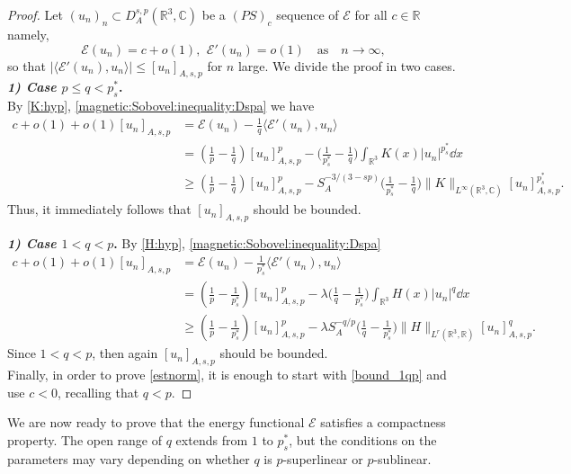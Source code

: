 \documentclass[leqno,11pt]{amsart}
\newcommand{\R}{\mathbb R}
\newcommand{\C}{\mathbb C}
\newcommand{\cE}{{\mathcal E}}
\numberwithin{equation}{section}
\begin{document}
\begin{proof}
Let $(u_{n})_{n}\subset D^{s,p}_A(\R^3,\C)$ be a $(PS)_{c}$ sequence of $\cE$ for all $c\in\R$ namely, 
\begin{equation}\label{PS_prop}\cE(u_{n})=c+o(1), \,\ \cE'(u_{n})=o(1)\quad \text{as} \quad n\to\infty,\end{equation}
so that $|\langle \cE'(u_{n}),u_{n}\rangle|\le [u_n]_{A,s,p}$ for $n$ large. We divide the proof in two cases.\\
\textbf{\textit{1) Case $p\le q<p^*_s$}.}\\
By \eqref{K:hyp}, \eqref{magnetic:Sobovel:inequality:Dspa} we have
$$\begin{aligned}
c +o(1) +o(1)[u_n]_{A,s,p}&= \cE(u_{n})- \frac{1}{q}\langle \cE'(u_{n}),u_{n}\rangle\\
&= \left(\frac{1}{p}-\frac{1}{q}\right)[u_n]_{A,s,p}^p
-\biggl(\frac1{p^*_s}-\frac 1{q}  \biggr)\int_{\R^3}K(x)|u_n|^{p^*_s}\dd x\\
&\ge \left(\frac{1}{p}-\frac{1}{q}\right)[u_n]_{A,s,p}^p- S_A^{-3/(3-sp)}\biggl(\frac 1{p^*_s} -\frac1{q} \biggr)\|K\|_{L^{\infty}(\R^3,\C)}[u_n]_{A,s,p}^{p^*_s}.
\end{aligned}$$
Thus, it immediately follows that
$[u_n]_{A,s,p}$ should be bounded.

\textbf{\textit{1) Case $1<q<p$}.}
By \eqref{H:hyp}, \eqref{magnetic:Sobovel:inequality:Dspa}
\begin{equation}\label{bound_1qp}\begin{aligned}
c +o(1) +o(1)[u_n]_{A,s,p}&= \cE(u_{n})- \frac{1}{p^*_s}\langle \cE'(u_{n}),u_{n}\rangle\\
&= \left(\frac{1}{p}-\frac{1}{p^*_s}\right)[u_n]_{A,s,p}^p
-\lambda\biggl(\frac1q - \frac{1}{p^*_s}  \biggr)\int_{\R^3}H(x)|u_n|^{q}\dd x\\
&\ge \left(\frac{1}{p}-\frac{1}{p^*_s}\right)[u_n]_{A,s,p}^p-\lambda S_A^{-q/p}\biggl(\frac1q - \frac{1}{p^*_s} \biggr)\|H\|_{L^r(\R^3,\R)}[u_n]_{A,s,p}^q.
\end{aligned}\end{equation}
Since $1<q<p$, then again $[u_n]_{A,s,p}$ should be bounded.\\


Finally, in order to prove \eqref{estnorm}, it is enough to start with \eqref{bound_1qp} and use $c<0$, recalling that $q<p$.
\end{proof}


We are now ready to prove that the energy functional $\cE$ satisfies a compactness property. The open range of $q$ extends from $1$ to $p^*_s$, but the conditions on the parameters may vary depending on whether $q$ is $p$-superlinear or $p$-sublinear.
\end{document}
